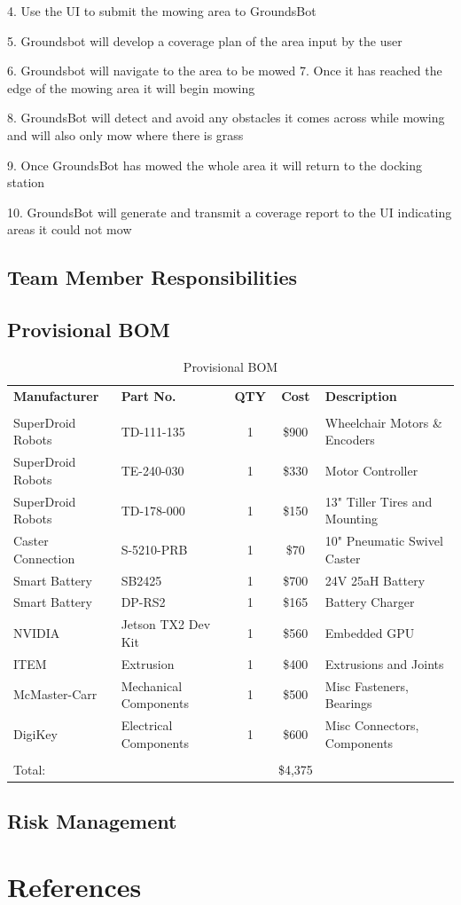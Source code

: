 \documentclass{article}
\begin{document}
4. Use the UI to submit the mowing area to GroundsBot

5. Groundsbot will develop a coverage plan of the area input by the user


6. Groundsbot will navigate to the area to be mowed
7. Once it has reached the edge of the mowing area it will begin mowing

8. GroundsBot will detect and avoid any obstacles it comes across while mowing and will also only mow where there is grass

9. Once GroundsBot has mowed the whole area it will return to the docking station

10. GroundsBot will generate and transmit a coverage report to the UI indicating areas it could not mow

\subsection{Team Member Responsibilities}
\subsection{Provisional BOM}
\begin{table}[H]
\centering
\def\arraystretch{1.1}
\caption{Provisional BOM}\label{Tab:provisional_bom}
\begin{tabular}{ llccl }
\hline
    \textbf{Manufacturer} & \textbf{Part No.} & \textbf{QTY} & \textbf{Cost} & \textbf{Description}\\
    \\[-.8ex]
    SuperDroid Robots & TD-111-135 & 1 & \$900 & Wheelchair Motors \& Encoders \\
	SuperDroid Robots & TE-240-030 & 1 & \$330 & Motor Controller \\
	SuperDroid Robots & TD-178-000 & 1 & \$150 & 13" Tiller Tires and Mounting \\
	Caster Connection & S-5210-PRB & 1 & \$70 & 10" Pneumatic Swivel Caster \\
	Smart Battery & SB2425 & 1 & \$700 & 24V 25aH Battery \\
    Smart Battery & DP-RS2 & 1 & \$165 & Battery Charger \\
    NVIDIA & Jetson TX2 Dev Kit & 1 & \$560 &  Embedded GPU \\
	ITEM & Extrusion & 1 & \$400 & Extrusions and Joints \\
	McMaster-Carr & Mechanical Components & 1 & \$500 & Misc Fasteners, Bearings \\
	DigiKey & Electrical Components & 1 & \$600 & Misc Connectors, Components \\[.5ex]
	\hline 
	\\[-2ex]
	Total: &&& \$4,375 &\\
	
    
\end{tabular}
\end{table}

\subsection{Risk Management}
\section{References}
\end{document}
